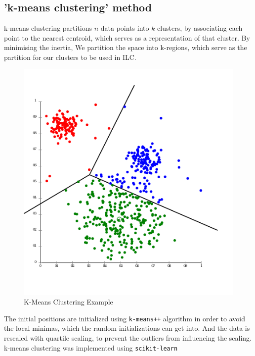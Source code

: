 \subsection{'k-means clustering' method}
k-means clustering partitions $n$ data points into $k$ clusters, by associating each point to the
nearest centroid, which serves as a representation of that cluster. By minimising the inertia,
We partition the space into k-regions, which serve as the partition for our clusters to be used in
ILC.
\begin{figure}
  \begin{center}
  \includegraphics[width = 0.5\linewidth]{kmeans_example.png}
  \end{center}
  \caption{K-Means Clustering Example}
\end{figure}

The initial positions are initialized using \texttt{k-means++} algorithm in order to avoid the
local minimas, which the random initializations can get into. And the data is rescaled with
quartile scaling, to prevent the outliers from influencing the scaling.
k-means clustering was implemented
using \texttt{scikit-learn} \cite{scikit-learn}

